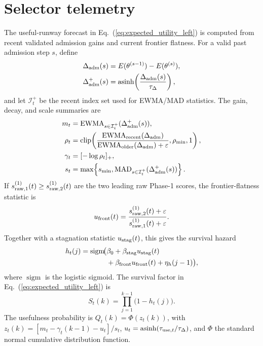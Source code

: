 \documentclass[
  reprint,
  amsmath,
  amssymb,
  aps,
  pra,
  nofootinbib,
  superscriptaddress,
  floatfix
]{revtex4-2}
\newcommand{\eps}{\varepsilon}
\begin{document}
\section{Selector telemetry}
\label{app:controller_telemetry}

The useful-runway forecast in Eq.~(\ref{eq:expected_utility_left}) is computed from recent validated admission gains and current frontier flatness. For a valid past admission step $s$, define
\begin{equation}
\begin{aligned}
\Delta_{\rm adm}(s)
&=E(\theta^{(s-1)})-E(\theta^{(s)}),\\
\Delta_{\rm adm}^{+}(s)
&=\operatorname{asinh}\!\left(\frac{\Delta_{\rm adm}(s)}{\tau_\Delta}\right),
\end{aligned}
\label{eq:appendix_admission_gain}
\end{equation}
and let $\mathcal I_t^+$ be the recent index set used for EWMA/MAD statistics. The gain, decay, and scale summaries are
\begin{equation}
\begin{aligned}
m_t&=\operatorname{EWMA}_{s\in\mathcal I_t^+}(\Delta_{\rm adm}^{+}(s)),\\
\rho_t&=\operatorname{clip}\!\left(
\frac{\operatorname{EWMA}_{\rm recent}(\Delta_{\rm adm})}
{\operatorname{EWMA}_{\rm older}(\Delta_{\rm adm})+\eps},
\rho_{\min},1\right),\\
\gamma_t&=[-\log\rho_t]_+,\\
s_t&=\max\!\left\{s_{\min},
\operatorname{MAD}_{s\in\mathcal I_t^+}(\Delta_{\rm adm}^{+}(s))\right\}.
\end{aligned}
\label{eq:appendix_runway_stats}
\end{equation}
If $s_{{\rm raw},1}^{(1)}(t)\ge s_{{\rm raw},2}^{(1)}(t)$ are the two leading raw Phase-1 scores, the frontier-flatness statistic is
\begin{equation}
u_{\rm front}(t)=
\frac{s_{{\rm raw},2}^{(1)}(t)+\eps}
{s_{{\rm raw},1}^{(1)}(t)+\eps}.
\label{eq:appendix_frontier_flatness}
\end{equation}
Together with a stagnation statistic $u_{\rm stag}(t)$, this gives the survival hazard
\begin{equation}
\begin{split}
h_t(j)=\operatorname{sigm}\!\bigl(&
\beta_0+\beta_{\rm stag}u_{\rm stag}(t)\\
&+\beta_{\rm front}u_{\rm front}(t)+\eta_h(j-1)
\bigr),
\end{split}
\label{eq:appendix_survival_hazard}
\end{equation}
where $\operatorname{sigm}$ is the logistic sigmoid. The survival factor in Eq.~(\ref{eq:expected_utility_left}) is
\begin{equation}
S_t(k)=\prod_{j=1}^{k-1}\bigl(1-h_t(j)\bigr).
\label{eq:appendix_survival_usefulness}
\end{equation}
The usefulness probability is $Q_t(k)=\Phi(z_t(k))$, with
$z_t(k)=[m_t-\gamma_t(k-1)-u_t]/s_t$,
$u_t=\operatorname{asinh}(\tau_{{\rm use},t}/\tau_\Delta)$, and
$\Phi$ the standard normal cumulative distribution function.
\end{document}
